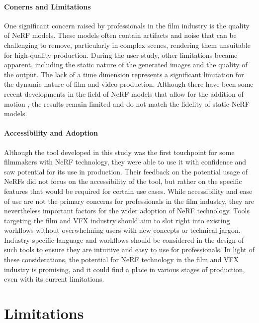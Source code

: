 \paragraph{Conerns and Limitations}
One significant concern raised by professionals in the film industry is the quality of NeRF models. These models often contain artifacts and noise that can be challenging to remove, particularly in complex scenes, rendering them unsuitable for high-quality production.
During the user study, other limitations became apparent, including the static nature of the generated images and the quality of the output. The lack of a time dimension represents a significant limitation for the dynamic nature of film and video production.
Although there have been some recent developments in the field of NeRF models that allow for the addition of motion  \cite{fridovich-keil_k-planes_2023}, the results remain limited and do not match the fidelity of static NeRF models.

\paragraph{Accessibility and Adoption}

Although the tool developed in this study was the first touchpoint for some filmmakers with NeRF technology, they were able to use it with confidence and saw potential for its use in production.
Their feedback on the potential usage of NeRFs did not focus on the accessibility of the tool, but rather on the specific features that would be required for certain use cases.
While accessibility and ease of use are not the primary concerns for professionals in the film industry, they are nevertheless important factors for the wider adoption of NeRF technology.
Tools targeting the film and VFX industry should aim to slot right into existing workflows without overwhelming users with new concepts or technical jargon.
Industry-specific language and workflows should be considered in the design of such tools to ensure they are intuitive and easy to use for professionals.
In light of these considerations, the potential for NeRF technology in the film and VFX industry is promising, and it could find a place in various stages of production, even with its current limitations.

\section{Limitations}
\label{sec:discussion:limitations}

